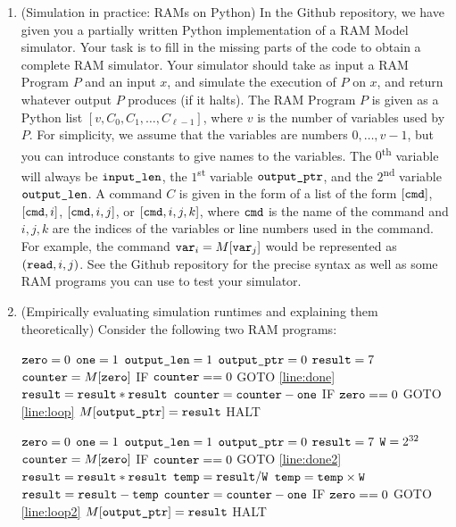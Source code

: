 \documentclass[11pt]{article}
\begin{document}
\begin{enumerate}
 
    \item (Simulation in practice: RAMs on Python)  
    In the Github repository, we have given you a partially written Python implementation of a RAM Model simulator.  Your task is to fill in the missing parts of the code to obtain a complete RAM simulator.
     Your simulator should take as input a RAM Program $P$ and an input $x$, and simulate the execution of $P$ on $x$, and return whatever output $P$ produces (if it halts).  The RAM Program $P$ is given as a Python list $[v,C_0,C_1,\ldots,C_{\ell-1}]$, where $v$ is the number of variables used by $P$.  For simplicity, we assume that the variables are numbers $0,\ldots,v-1$, but you can introduce constants to give names to the variables.  The $0$\textsuperscript{th} variable will always be $\texttt{input\_len}$, the $1$\textsuperscript{st} variable $\texttt{output\_ptr}$, and the $2$\textsuperscript{nd} variable $\texttt{output\_len}$.  A command $C$ is given in the form of a list of the form $[\texttt{cmd}]$, $[\texttt{cmd},i]$, $[\texttt{cmd},i,j]$, or $[\texttt{cmd},i,j,k]$, where $\texttt{cmd}$ is the name of the command and $i,j,k$ are the indices of the variables or line numbers used in the command.  For example,  the command $\texttt{var}_i = M[\texttt{var}_j]$ would be represented as $(\texttt{read},i,j)$.  See the Github repository for the precise syntax as well as some RAM programs you can use to test your simulator.

    \item (Empirically evaluating simulation runtimes and explaining them theoretically)  
    Consider the following two RAM programs:
    
\begin{algorithm}[H]
$\texttt{zero} = 0$\;
$\texttt{one} = 1$\;
$\texttt{output\_len} = 1$\;
$\texttt{output\_ptr} = 0$\;
$\texttt{result} = 7$\;
$\texttt{counter} = M[\texttt{zero}]$\;
\Indp
 IF $\texttt{counter} == 0$ GOTO \ref{line:done}\; \label{line:loop}
$\texttt{result} = \texttt{result} * \texttt{result}$\;
$\texttt{counter} = \texttt{counter} - \texttt{one}$\;
IF $\texttt{zero} == 0$ GOTO \ref{line:loop}\;
\Indm
$M[\texttt{output\_ptr}]=\texttt{result}$\; \label{line:done}
HALT\;
\end{algorithm}


\begin{algorithm}[H]
$\texttt{zero} = 0$\;
$\texttt{one} = 1$\;
$\texttt{output\_len} = 1$\;
$\texttt{output\_ptr} = 0$\;
$\texttt{result} = 7$\;
$\texttt{W} = 2^{32}$\;
$\texttt{counter} = M[\texttt{zero}]$\;
\Indp
IF $\texttt{counter} == 0$ GOTO \ref{line:done2}\; \label{line:loop2}
$\texttt{result} = \texttt{result} * \texttt{result}$\;
$\texttt{temp} = \texttt{result} / \texttt{W}$\;
$\texttt{temp} = \texttt{temp} \times \texttt{W}$\;
$\texttt{result} = \texttt{result} - \texttt{temp}$\;
$\texttt{counter} = \texttt{counter} - \texttt{one}$\;
IF $\texttt{zero} == 0$ GOTO \ref{line:loop2}\;
\Indm
$M[\texttt{output\_ptr}]=\texttt{result}$\; \label{line:done2} 
HALT \;
\end{algorithm}



\end{enumerate}
\end{document}
